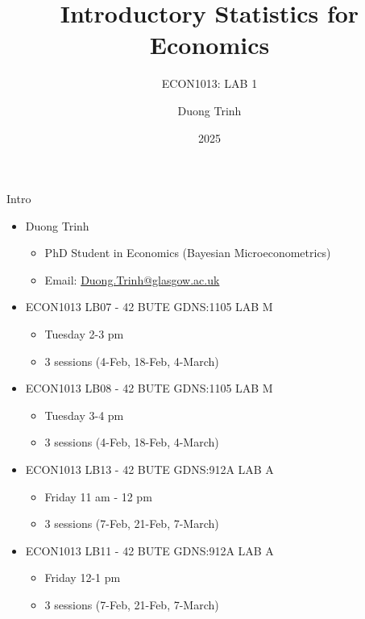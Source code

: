 \documentclass[
  10pt,
  ignorenonframetext,
]{beamer}
\title{Introductory Statistics for Economics}
\subtitle{ECON1013: LAB 1}
\author{Duong Trinh}
\date{2025}
\institute{University of Glasgow}
\providecommand{\tightlist}{%
  \setlength{\itemsep}{0pt}\setlength{\parskip}{0pt}}
\begin{document}
\frame{\titlepage}

\begin{frame}{Intro}
\protect\hypertarget{intro}{}
\begin{itemize}
\tightlist
\item
  Duong Trinh

  \begin{itemize}
  \tightlist
  \item
    PhD Student in Economics (Bayesian Microeconometrics)
  \item
    Email: \underline{Duong.Trinh@glasgow.ac.uk}
  \end{itemize}
\end{itemize}

\vspace{2mm}

\begin{itemize}
\tightlist
\item
  ECON1013 LB07 - 42 BUTE GDNS:1105 LAB M

  \begin{itemize}
  \tightlist
  \item
    Tuesday 2-3 pm
  \item
    3 sessions (4-Feb, 18-Feb, 4-March)
  \end{itemize}
\item
  ECON1013 LB08 - 42 BUTE GDNS:1105 LAB M

  \begin{itemize}
  \tightlist
  \item
    Tuesday 3-4 pm
  \item
    3 sessions (4-Feb, 18-Feb, 4-March)
  \end{itemize}
\item
  ECON1013 LB13 - 42 BUTE GDNS:912A LAB A

  \begin{itemize}
  \tightlist
  \item
    Friday 11 am - 12 pm
  \item
    3 sessions (7-Feb, 21-Feb, 7-March)
  \end{itemize}
\item
  ECON1013 LB11 - 42 BUTE GDNS:912A LAB A

  \begin{itemize}
  \tightlist
  \item
    Friday 12-1 pm
  \item
    3 sessions (7-Feb, 21-Feb, 7-March)
  \end{itemize}
\end{itemize}

\vspace{3mm}
\end{frame}
\end{document}

